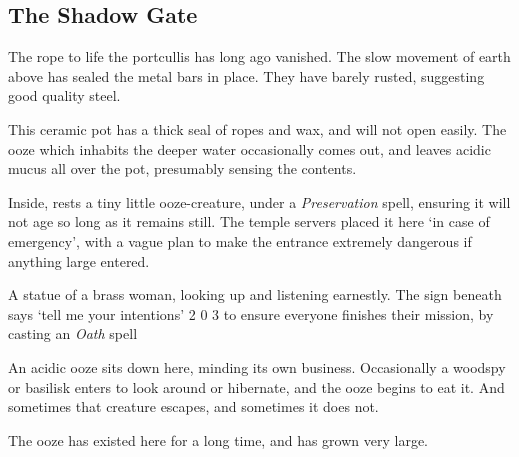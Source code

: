 \subsection{The Shadow Gate}


The rope to life the portcullis has long ago vanished.
The slow movement of earth above has sealed the metal bars in place.
They have barely rusted, suggesting good quality steel.





This ceramic pot has a thick seal of ropes and wax, and will not open easily.
The ooze which inhabits the deeper water  occasionally comes out, and leaves acidic mucus all over the pot, presumably sensing the contents.

Inside, rests a tiny little ooze-creature, under a \textit{Preservation} spell, ensuring it will not age so long as it remains still.
The temple \glspl{server} placed it here `in case of emergency', with a vague plan to make the entrance extremely dangerous if anything large entered.

\setcounter{r4}{1}


  {A statue of a brass woman, looking up and listening earnestly.
  The sign beneath says `tell me your intentions'}%
  {2}%
  {0}%
  {3}%
  {to ensure everyone finishes their mission, by casting an \textit{Oath} spell}%
  {
    \setcounter{Fate}{2}
    \setcounter{Water}{2}
    \setcounter{Empathy}{2}
    \setcounter{Wyldcrafting}{1}
  }%

\showStdSpells[
  \setcounter{diceNo}{2}
  \setcounter{enc}{2}
]


An acidic ooze sits down here, minding its own business.
Occasionally a woodspy or basilisk enters to look around or hibernate, and the ooze begins to eat it.
And sometimes that creature escapes, and sometimes it does not.

The ooze has existed here for a long time, and has grown very large.

